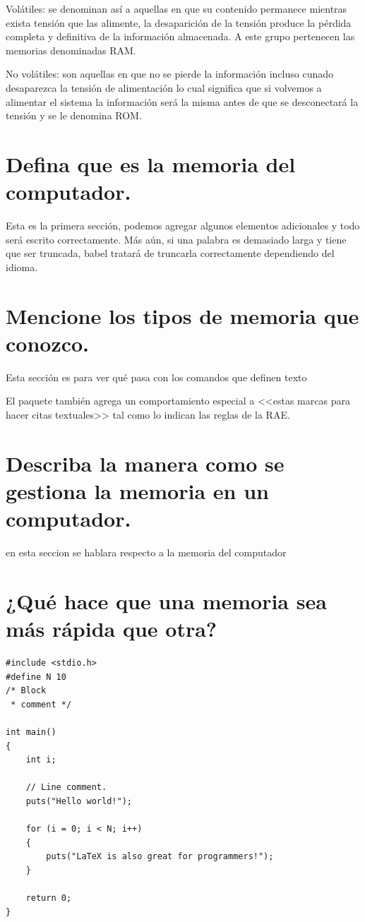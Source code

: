 \documentclass{article}
\begin{document}
Volátiles: se denominan así a aquellas en que su contenido permanece mientras exista tensión que las alimente, la desaparición de la tensión produce la pérdida completa y definitiva de la información almacenada. A este grupo pertenecen las memorias denominadas RAM.

No volátiles: son aquellas en que no se pierde la información incluso cunado desaparezca la tensión de alimentación lo cual significa que si volvemos a alimentar el sistema la información será la misma antes de que se desconectará la tensión y se le denomina ROM.


\section{Defina que es la memoria del computador.}
Esta es la primera sección, podemos agregar algunos elementos adicionales y todo será escrito correctamente. Más aún, si una palabra es demasiado larga y tiene que ser truncada, babel tratará de truncarla correctamente dependiendo del idioma.

\section{Mencione los tipos de memoria que conozco.} \label{contenido}

Esta sección es para ver qué pasa con los comandos 
que definen texto

El paquete también agrega un comportamiento especial 
a <<estas marcas para hacer citas textuales>> tal como 
lo indican las reglas de la RAE. \cite{dirac}


\section{Describa la manera como se gestiona la memoria en un computador.}

en esta seccion se hablara respecto a la memoria del computador 


\section{¿Qué hace que una memoria sea más rápida que otra?}
\begin{lstlisting}
#include <stdio.h>
#define N 10
/* Block
 * comment */

int main()
{
    int i;

    // Line comment.
    puts("Hello world!");
    
    for (i = 0; i < N; i++)
    {
        puts("LaTeX is also great for programmers!");
    }

    return 0;
}
\end{lstlisting}
\end{document}
